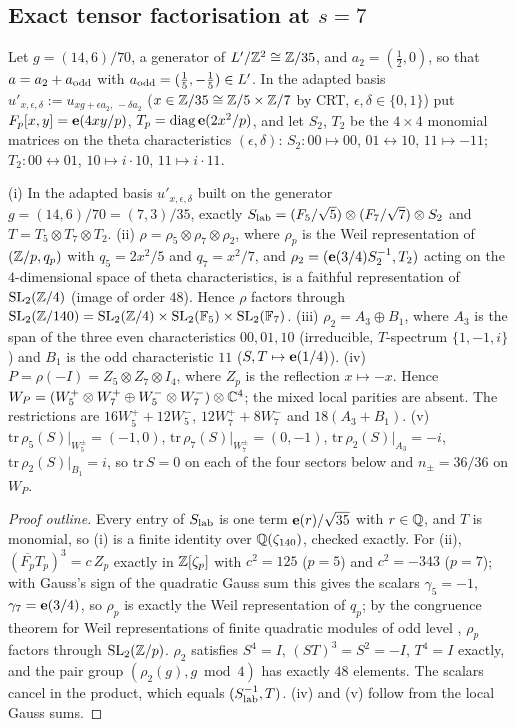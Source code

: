 \subsection{Exact tensor factorisation at $s=7$}
Let $g=(14,6)/70$, a generator of $L'/\mathbb{Z}^2\cong\mathbb{Z}/35$, and $a_2=(\tfrac12,0)$, so that $a=a_2+a_{\rm odd}$ with $a_{\rm odd}=(\tfrac15,-\tfrac15)\in L'$. In the
adapted basis $u'_{x,\epsilon,\delta}:=u_{xg+\epsilon a_2,\,-\delta a_2}$ ($x\in\mathbb{Z}/35\cong\mathbb{Z}/5\times\mathbb{Z}/7$ by CRT, $\epsilon,\delta\in\{0,1\}$) put
$F_p[x,y]=\mathbf{e}(4xy/p)$, $T_p=\mathrm{diag}\,\mathbf{e}(2x^2/p)$, and let $S_2$, $T_2$ be the $4\times4$ monomial matrices on the theta characteristics $(\epsilon,\delta)$:
$S_2:00\mapsto00$, $01\leftrightarrow10$, $11\mapsto-11$; $T_2:00\leftrightarrow01$, $10\mapsto i\cdot10$, $11\mapsto i\cdot11$.
\begin{theorem}[Tensor factorisation, $s=7$]\label{thm:tensor7}
(i) In the adapted basis $u'_{x,\epsilon,\delta}$ built on the generator $g=(14,6)/70=(7,3)/35$, exactly $S_{\rm lab}=(F_5/\sqrt5)\otimes(F_7/\sqrt7)\otimes S_2$ and $T=T_5\otimes T_7\otimes T_2$.
(ii) $\rho=\rho_5\otimes\rho_7\otimes\rho_2$, where $\rho_p$ is the Weil representation of $(\mathbb{Z}/p,q_p)$ with $q_5=2x^2/5$ and $q_7=x^2/7$, and
$\rho_2=(\mathbf{e}(3/4)S_2^{-1},T_2)$ acting on the $4$-dimensional space of theta characteristics, is a faithful representation of $\mathrm{SL}_2(\mathbb{Z}/4)$ (image of order $48$). Hence $\rho$ factors through
$\mathrm{SL}_2(\mathbb{Z}/140)=\mathrm{SL}_2(\mathbb{Z}/4)\times\mathrm{SL}_2(\mathbb F_5)\times\mathrm{SL}_2(\mathbb F_7)$.
(iii) $\rho_2=A_3\oplus B_1$, where $A_3$ is the span of the three even characteristics $00,01,10$ (irreducible, $T$-spectrum $\{1,-1,i\}$) and $B_1$ is the odd
characteristic $11$ ($S,T\mapsto\mathbf{e}(1/4)$).
(iv) $P=\rho(-I)=Z_5\otimes Z_7\otimes I_4$, where $Z_p$ is the reflection $x\mapsto-x$. Hence
$W_P=(W_5^+\otimes W_7^+\oplus W_5^-\otimes W_7^-)\otimes\mathbb{C}^4$; the mixed local parities are absent. The restrictions are $16W_5^++12W_5^-$,
$12W_7^++8W_7^-$ and $18(A_3+B_1)$.
(v) $\mathrm{tr}\,\rho_5(S)|_{W_5^\pm}=(-1,0)$, $\mathrm{tr}\,\rho_7(S)|_{W_7^\pm}=(0,-1)$, $\mathrm{tr}\,\rho_2(S)|_{A_3}=-i$, $\mathrm{tr}\,\rho_2(S)|_{B_1}=i$, so $\mathrm{tr}\,S=0$ on each of the
four sectors below and $n_\pm=36/36$ on $W_P$.
\end{theorem}
\begin{proof}[Proof outline]
Every entry of $S_{\rm lab}$ is one term $\mathbf{e}(r)/\sqrt{35}$ with $r\in\mathbb{Q}$, and $T$ is monomial, so (i) is a finite identity over $\mathbb{Q}(\zeta_{140})$, checked
exactly. For (ii), $(\overline{F_p}T_p)^3=c\,Z_p$ exactly in $\mathbb{Z}[\zeta_p]$ with $c^2=125$ ($p=5$) and $c^2=-343$ ($p=7$); with Gauss's sign of the quadratic
Gauss sum this gives the scalars $\gamma_5=-1$, $\gamma_7=\mathbf{e}(3/4)$, so $\rho_p$ is exactly the Weil representation of $q_p$; by the congruence theorem for Weil
representations of finite quadratic modules of odd level \cite{Weil}, $\rho_p$ factors through $\mathrm{SL}_2(\mathbb{Z}/p)$. $\rho_2$ satisfies $S^4=I$,
$(ST)^3=S^2=-I$, $T^4=I$ exactly, and the pair group $(\rho_2(g),g\bmod4)$ has exactly $48$ elements. The scalars cancel in the product, which equals
$(S_{\rm lab}^{-1},T)$. (iv) and (v) follow from the local Gauss sums.
\end{proof}
